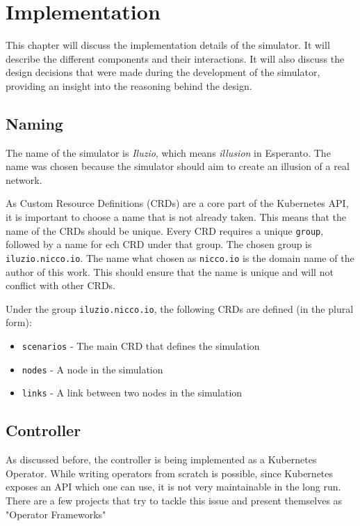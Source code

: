 \chapter{Implementation}
\label{chapter:implementation}

This chapter will discuss the implementation details of the simulator. It will describe the different components and their interactions. It will also discuss the design decisions that were made during the development of the simulator, providing an insight into the reasoning behind the design.

\section{Naming}

The name of the simulator is \textit{Iluzio}, which means \textit{illusion} in Esperanto. The name was chosen because the simulator should aim to create an illusion of a real network.

As Custom Resource Definitions (CRDs) are a core part of the Kubernetes API, it is important to choose a name that is not already taken. This means that the name of the CRDs should be unique. Every CRD requires a unique \verb|group|, followed by a name for ech CRD under that group. The chosen group is \verb|iluzio.nicco.io|. The name what chosen as \verb|nicco.io| is the domain name of the author of this work. This should ensure that the name is unique and will not conflict with other CRDs.

Under the group \verb|iluzio.nicco.io|, the following CRDs are defined (in the plural form):

\begin{itemize}
  \item \verb|scenarios| - The main CRD that defines the simulation
  \item \verb|nodes| - A node in the simulation
  \item \verb|links| - A link between two nodes in the simulation
\end{itemize}

\section{Controller}

As discussed before, the controller is being implemented as a Kubernetes Operator. While writing operators from scratch is possible, since Kubernetes exposes an API which one can use, it is not very maintainable in the long run. There are a few projects that try to tackle this issue and present themselves as "Operator Frameworks"

